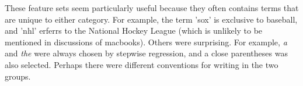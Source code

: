 \documentclass{article}
\begin{document}
  \noindent These feature sets seem particularly useful because they often contains terms that are unique to either category. 
  For example, the term 'sox' is exclusive to baseball, and 'nhl' erferrs to the National Hockey League (which is unlikely to be mentioned in discussions of macbooks).
  Others were surprising. For example, \emph{a} and \emph{the} were always chosen by stepwise regression, and a close parentheses was also selected. Perhaps there were different conventions for writing in the two groups.
\end{document}
